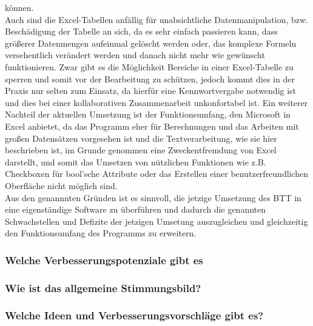 können.\\Auch sind die Excel-Tabellen anfällig für unabsichtliche Datenmanipulation, bzw. Beschädigung der Tabelle an sich, da es sehr einfach passieren kann, dass größerer Datenmengen aufeinmal gelöscht werden oder, das komplexe Formeln versehentlich verändert werden und danach nicht mehr wie gewünscht funktionieren. Zwar gibt es die Möglichkeit Bereiche in einer Excel-Tabelle zu sperren und somit vor der Bearbeitung zu schützen, jedoch kommt dies in der Praxis nur selten zum Einsatz, da hierfür eine Kennwortvergabe notwendig ist und dies bei einer kollaborativen Zusammenarbeit unkonfortabel ist. Ein weiterer Nachteil der aktuellen Umsetzung ist der Funktionsumfang, den Microsoft in Excel anbietet, da das Programm eher für Berechnungen und das Arbeiten mit großen Datensätzen vorgesehen ist und die Textverarbeitung, wie sie hier beschrieben ist, im Grunde genommen eine Zweckentfremdung von Excel darstellt, und somit das Umsetzen von nützlichen Funktionen wie z.B. Checkboxen für bool'sche Attribute oder das Erstellen einer benutzerfreundlichen Oberfläche nicht möglich sind.\\ Aus den genannnten Gründen ist es sinnvoll, die jetzige Umsetzung des BTT in eine eigenständige Software zu überführen und dadurch die genannten Schwachstellen und Defizite der jetzigen Umsetung auszugleichen und gleichzeitig den Funktionsumfang des Programms zu erweitern.



\subsubsection{Welche Verbesserungspotenziale gibt es}

\subsubsection{Wie ist das allgemeine Stimmungsbild?}

\subsubsection{Welche Ideen und Verbesserungsvorschläge gibt es?}


